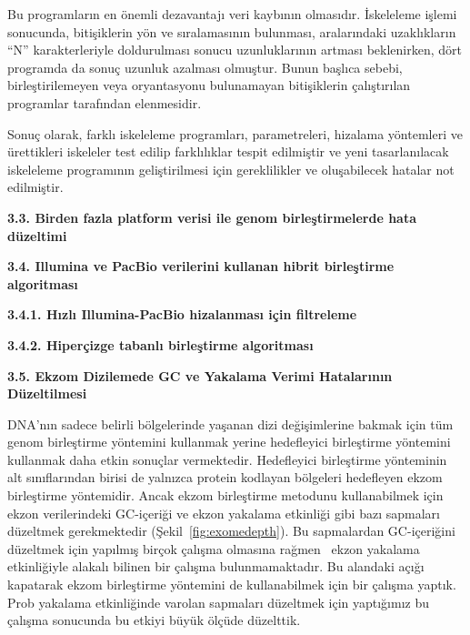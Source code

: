 \documentclass[11pt]{article}
\begin{document}
Bu programların en önemli dezavantajı veri kaybının olmasıdır. İskeleleme işlemi sonucunda, bitişiklerin yön ve sıralamasının bulunması, aralarındaki uzaklıkların ``N'' 
karakterleriyle doldurulması sonucu uzunluklarının artması beklenirken, dört programda da sonuç uzunluk azalması olmuştur. Bunun başlıca sebebi, birleştirilemeyen veya oryantasyonu bulunamayan bitişiklerin çalıştırılan programlar tarafından elenmesidir.

Sonuç olarak, farklı iskeleleme programları, parametreleri, hizalama yöntemleri ve ürettikleri iskeleler test edilip farklılıklar tespit edilmiştir ve yeni tasarlanılacak iskeleleme programının geliştirilmesi için gereklilikler ve oluşabilecek hatalar not edilmiştir.

\clearpage
{\bf \large 3.3. Birden fazla platform verisi ile genom birleştirmelerde hata düzeltimi}



\clearpage

{\bf \large 3.4. Illumina ve PacBio verilerini kullanan hibrit birleştirme algoritması}


{\bf 3.4.1. Hızlı Illumina-PacBio hizalanması için filtreleme}



{\bf 3.4.2. Hiperçizge tabanlı birleştirme algoritması}




\clearpage

{\bf \large 3.5. Ekzom Dizilemede GC ve Yakalama Verimi Hatalarının Düzeltilmesi}

DNA'nın sadece belirli bölgelerinde yaşanan dizi değişimlerine bakmak için tüm genom birleştirme yöntemini kullanmak yerine hedefleyici birleştirme yöntemini kullanmak daha etkin sonuçlar vermektedir. Hedefleyici birleştirme yönteminin alt sınıflarından birisi de yalnızca protein kodlayan bölgeleri hedefleyen ekzom birleştirme yöntemidir. Ancak ekzom birleştirme metodunu kullanabilmek için ekzon verilerindeki GC-içeriği ve ekzon yakalama etkinliği gibi bazı sapmaları düzeltmek gerekmektedir (Şekil~\ref{fig:exomedepth}). Bu sapmalardan GC-içeriğini düzeltmek için yapılmış birçok çalışma olmasına rağmen~\cite{Krumm2012,Fromer2012} ekzon yakalama etkinliğiyle alakalı bilinen bir çalışma bulunmamaktadır. Bu alandaki açığı kapatarak ekzom birleştirme yöntemini de kullanabilmek için bir çalışma yaptık. Prob yakalama etkinliğinde varolan sapmaları düzeltmek için yaptığımız bu çalışma sonucunda bu etkiyi büyük ölçüde düzelttik. 
\end{document}
